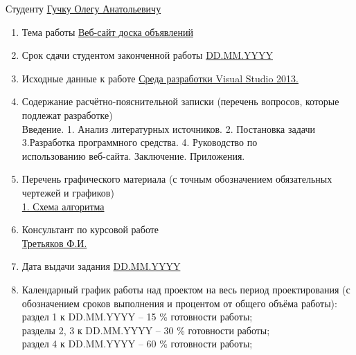\documentclass[14pt,a4paper]{extreport}
\begin{document}
	\raggedright
	Студенту \underline{Гучку Олегу Анатольевичу}\\
	\begin{enumerate}
	\item Тема работы \underline{Веб-сайт доска объявлений}\\ 
	\item Срок сдачи студентом законченной работы \underline{DD.MM.YYYY}
	\item Исходные данные к работе \underline{Среда разработки Visual Studio 2013. }
	\item Содержание расчётно-пояснительной записки (перечень вопросов, которые подлежат разработке)\\
	\underline{\hspace*{16cm}}\hspace*{-16cm}Введение. 1. Анализ литературных источников. 2. Постановка задачи\\
	\underline{\hspace*{16cm}}\hspace*{-16cm}3.Разработка программного средства. 4. Руководство по \\
	\underline{\hspace*{16cm}}\hspace*{-16cm}использованию веб-сайта. Заключение. Приложения.
	\item Перечень графического материала (с точным обозначением обязательных чертежей и графиков)\\
	\underline{1. Схема алгоритма}
	\item Консультант по курсовой работе\\
	\underline{Третьяков Ф.И.}  
	\item Дата выдачи задания \underline{DD.MM.YYYY}
	\item Календарный график работы над проектом на весь период проектирования (с обозначением сроков выполнения и процентом от общего объёма работы):\\
	\underline{\hspace*{16cm}}\hspace*{-16cm}раздел 1 к DD.MM.YYYY – 15 \% готовности работы;\\  
	\underline{\hspace*{16cm}}\hspace*{-16cm}разделы 2, 3 к DD.MM.YYYY – 30 \% готовности работы;\\ 
	\underline{\hspace*{16cm}}\hspace*{-16cm}раздел 4 к DD.MM.YYYY – 60 \% готовности работы;\\

\end{enumerate}
\end{document}
